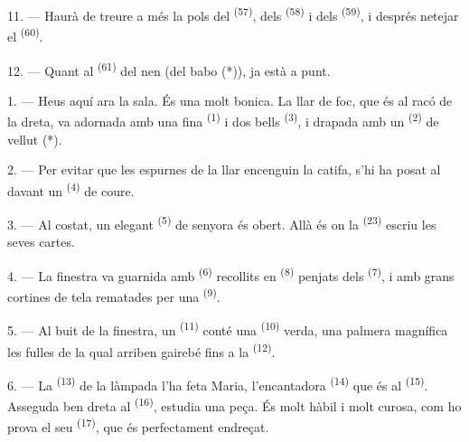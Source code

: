 

11. --- Haurà de treure a més la pols del 
\textsuperscript{(57)}, dels  \textsuperscript{(58)} i dels
 \textsuperscript{(59)}, i després netejar el
 \textsuperscript{(60)}.

12. --- Quant al  \textsuperscript{(61)} del nen (del babo (*)),
ja està a punt.

\VUsaut{5.0mm}
\VUsaut{3.0mm}

1. --- Heus aquí ara la sala. És una  molt bonica. La llar de
foc, que és al racó de la dreta, va adornada amb una fina 
\textsuperscript{(1)} i dos bells  \textsuperscript{(3)}, i drapada
amb un  \textsuperscript{(2)} de vellut (*).

2. --- Per evitar que les espurnes de la llar encenguin la catifa, s'hi ha posat
al davant un  \textsuperscript{(4)} de coure.

3. --- Al costat, un elegant  \textsuperscript{(5)} de senyora
és obert. Allà és on la  \textsuperscript{(23)} escriu
les seves cartes.

4. --- La finestra va guarnida amb  \textsuperscript{(6)}
recollits en  \textsuperscript{(8)} penjats dels 
\textsuperscript{(7)}, i amb grans cortines de tela rematades per una
 \textsuperscript{(9)}.

5. --- Al buit de la finestra, un  \textsuperscript{(11)} conté una
 \textsuperscript{(10)} verda, una palmera magnífica les fulles de
la qual arriben gairebé fins a la 
\textsuperscript{(12)}.

6. --- La  \textsuperscript{(13)} de la làmpada l'ha feta Maria,
l'encantadora  \textsuperscript{(14)} que és al 
\textsuperscript{(15)}. Asseguda ben dreta al 
\textsuperscript{(16)}, estudia una peça. És molt hàbil i molt curosa, com ho
prova el seu  \textsuperscript{(17)}, que és
perfectament endreçat.


